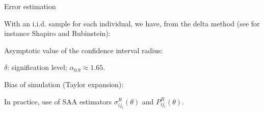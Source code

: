 \documentclass{beamer}
\begin{document}
\begin{frame}{Error estimation}
		
		
		\begin{footnotesize}
			
			With an i.i.d. sample for each individual, we have, from the delta
			method (see for instance Shapiro and Rubinstein):
			\begin{center}
			\end{center}
			
			Asymptotic value of the confidence interval radius:
			\begin{center}
			\end{center}
			$\delta$: signification level; $\alpha_{0.9} \approx 1.65$.
			
				Bias of simulation (Taylor expansion):
				\begin{center}
				\end{center}
				
				In practice, use of SAA estimators $\sigma^R_{ij_i}(\theta)$ and $P^R_{ij_i}(\theta)$.
			
		\end{footnotesize}
		
\end{frame}
\end{document}
